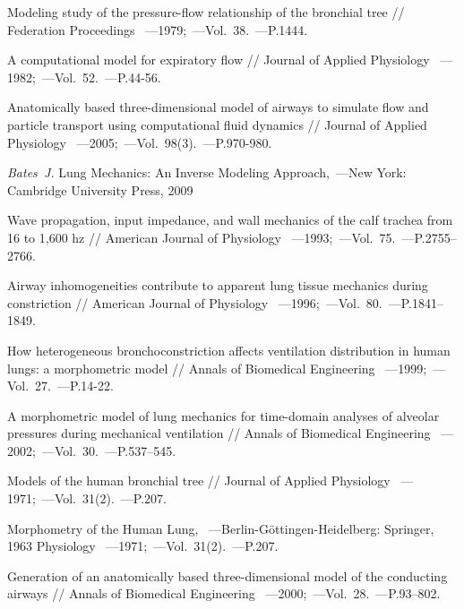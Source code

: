 \begin{thebibliography}{}
     Modeling study of the pressure-flow relationship of the bronchial tree // Federation
Proceedings ~---1979;~---Vol.~38.~---P.1444.

     A computational model for expiratory flow // Journal of Applied Physiology ~---1982;~---Vol.~52.~---P.44-56.
    
     Anatomically based three-dimensional model of airways to simulate flow and particle transport using computational fluid dynamics // Journal of Applied Physiology ~---2005;~---Vol.~98(3).~---P.970-980.
    
     {\it Bates~J.} Lung Mechanics: An Inverse Modeling Approach,~---New York:  Cambridge University Press, 2009
    
     Wave propagation, input impedance, and wall mechanics of the calf trachea from 16
to 1,600 hz // American Journal of Physiology ~---1993;~---Vol.~75.~---P.2755–2766.
    
     Airway inhomogeneities contribute to apparent lung tissue
mechanics during constriction // American Journal of Physiology ~---1996;~---Vol.~80.~---P.1841–1849.

     How heterogeneous bronchoconstriction affects ventilation distribution in human lungs: a
morphometric model // Annals of Biomedical Engineering ~---1999;~---Vol.~27.~---P.14-22.

     A morphometric model of lung mechanics for time-domain analyses of alveolar
pressures during mechanical ventilation // Annals of Biomedical Engineering ~---2002;~---Vol.~30.~---P.537–545.

     Models of the human bronchial tree // Journal of Applied
Physiology ~---1971;~---Vol.~31(2).~---P.207.

     Morphometry of the Human Lung, ~---Berlin-Göttingen-Heidelberg: Springer, 1963
Physiology ~---1971;~---Vol.~31(2).~---P.207.

     Generation of an anatomically based three-dimensional model of the conducting
airways // Annals of Biomedical Engineering ~---2000;~---Vol.~28.~---P.93–802.


\end{thebibliography}
